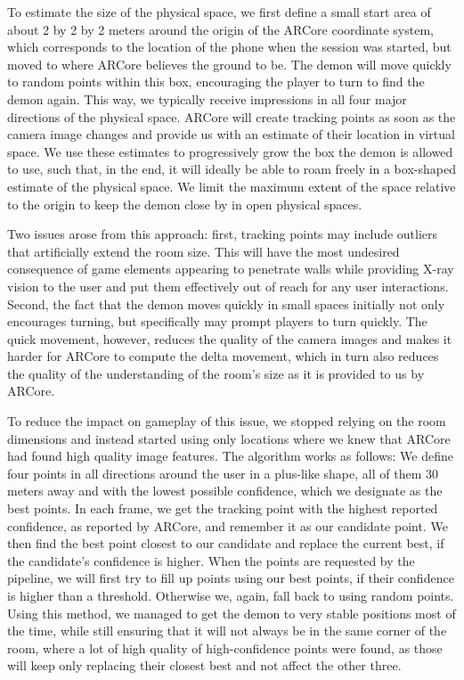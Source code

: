 To estimate the size of the physical space, we first define a small start area of about 2 by 2 by 2 meters around the origin of the ARCore coordinate system, which corresponds to the location of the phone when the session was started, but moved to where ARCore believes the ground to be.
The demon will move quickly to random points within this box, encouraging the player to turn to find the demon again.
This way, we typically receive impressions in all four major directions of the physical space.
ARCore will create tracking points as soon as the camera image changes and provide us with an estimate of their location in virtual space.
We use these estimates to progressively grow the box the demon is allowed to use, such that, in the end, it will ideally be able to roam freely in a box-shaped estimate of the physical space.
We limit the maximum extent of the space relative to the origin to keep the demon close by in open physical spaces.

Two issues arose from this approach: first, tracking points may include outliers that artificially extend the room size.
This will have the most undesired consequence of game elements appearing to penetrate walls while providing X-ray vision to the user and put them effectively out of reach for any user interactions.
Second, the fact that the demon moves quickly in small spaces initially not only encourages turning, but specifically may prompt players to turn quickly.
The quick movement, however, reduces the quality of the camera images and makes it harder for ARCore to compute the delta movement, which in turn also reduces the quality of the understanding of the room's size as it is provided to us by ARCore.

To reduce the impact on gameplay of this issue, we stopped relying on the room dimensions and instead started using only locations where we knew that ARCore had found high quality image features.
The algorithm works as follows: We define four points in all directions around the user in a plus-like shape, all of them 30 meters away and with the lowest possible confidence, which we designate as the best points.
In each frame, we get the tracking point with the highest reported confidence, as reported by ARCore, and remember it as our candidate point.
We then find the best point closest to our candidate and replace the current best, if the candidate's confidence is higher.
When the points are requested by the pipeline, we will first try to fill up points using our best points, if their confidence is higher than a threshold.
Otherwise we, again, fall back to using random points.
Using this method, we managed to get the demon to very stable positions most of the time, while still ensuring that it will not always be in the same corner of the room, where a lot of high quality of high-confidence points were found, as those will keep only replacing their closest best and not affect the other three.

